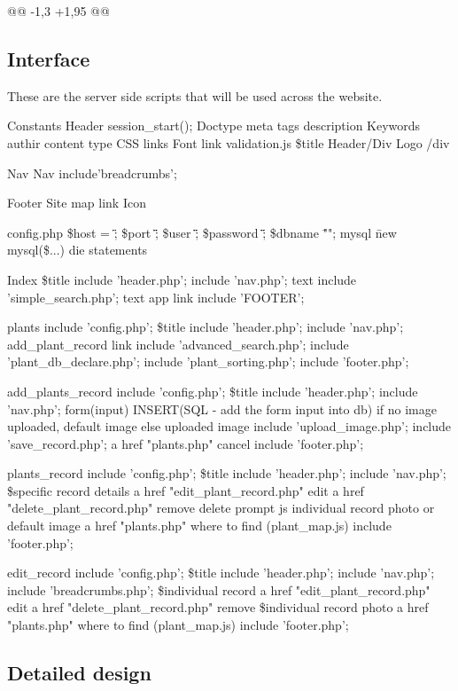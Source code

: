 @@ -1,3 +1,95 @@
\subsection{Interface}
These are the server side scripts that will be used across the website.

Constants	
Header
	session_start();
	Doctype
	meta tags
		description
		Keywords
		authir
		content type
		CSS links
		Font link
		validation.js
		\$title
	Header/Div
		Logo
	/div

Nav
	Nav
	include'breadcrumbs';
	
Footer 
	Site map link 
	Icon
	
	
config.php
	\$host = \"\";
	\$port \= \"\";
	\$user \= \"\";
	\$password \= \"\";
	\$dbname \= "";
	mysql \= new mysql(\$...)
	die statements

	
Index
	\$title
	include 'header.php';
	include 'nav.php';
	text
	include 'simple_search.php';
	text
		app link
	include 'FOOTER';
	
plants
	include 'config.php';
	\$title
	include 'header.php';
	include 'nav.php';
	add_plant_record link
	include 'advanced_search.php';
	include 'plant_db_declare.php';
	include 'plant_sorting.php';
	include 'footer.php';

add_plants_record
	include 'config.php';
	\$title
	include 'header.php';
	include 'nav.php';
	form(input)  INSERT(SQL - add the form input into db)
	if no image uploaded, default image else uploaded image
	include 'upload_image.php';
	include 'save_record.php';
	a href "plants.php" cancel
	include 'footer.php';


plants_record
	include 'config.php';
	\$title
	include 'header.php';
	include 'nav.php';
	\$specific record details
	a href "edit_plant_record.php" edit
	a href "delete_plant_record.php" remove
		delete prompt js
	individual record photo or default image
	a href "plants.php" where to find
		(plant_map.js)
	include 'footer.php';
	
	
	
	
edit_record
	include 'config.php';
	\$title
	include 'header.php';
	include 'nav.php';
	include 'breadcrumbs.php';
	\$individual record
	a href "edit_plant_record.php" edit
	a href "delete_plant_record.php" remove
	\$individual record photo
	a href "plants.php" where to find
		(plant_map.js)
	include 'footer.php';
	
\subsection{Detailed design}

